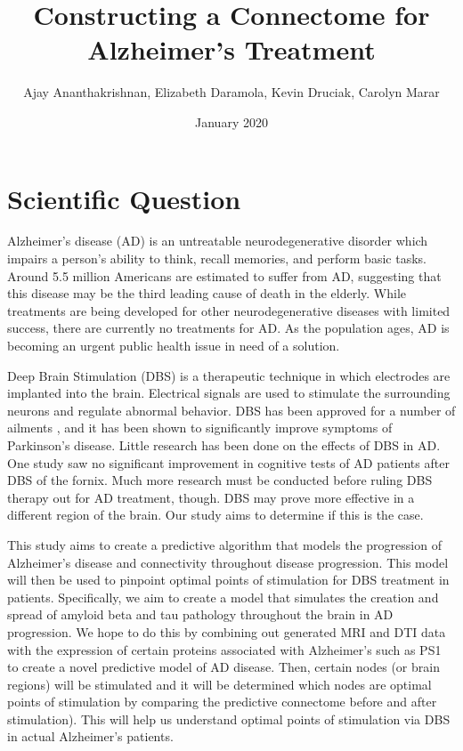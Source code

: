 \documentclass{article}
\title{Constructing a Connectome for Alzheimer's Treatment}
\author{Ajay Ananthakrishnan, Elizabeth Daramola, Kevin Druciak, Carolyn Marar }
\date{January 2020}
\begin{document}
\maketitle

\section{Scientific Question}
Alzheimer's disease (AD) is an untreatable neurodegenerative disorder which impairs a person's ability to think, recall memories, and perform basic tasks. Around 5.5 million Americans are estimated to suffer from AD, suggesting that this disease may be the third leading cause of death in the elderly. \cite{Alzheimer's Facts} While treatments are being developed for other neurodegenerative diseases with limited success, there are currently no treatments for AD. As the population ages, AD is becoming an urgent public health issue in need of a solution.

Deep Brain Stimulation (DBS) is a therapeutic technique in which electrodes are implanted into the brain. Electrical signals are used to stimulate the surrounding neurons and regulate abnormal behavior. DBS has been approved for a number of ailments \cite{DBS uses}, and it has been shown to significantly improve symptoms of Parkinson's disease. \cite{DBS PD} Little research has been done on the effects of DBS in AD. One study saw no significant improvement in cognitive tests of AD patients after DBS of the fornix. \cite{DBS AD} Much more research must be conducted before ruling DBS therapy out for AD treatment, though. DBS may prove more effective in a different region of the brain. Our study aims to determine if this is the case.

This study aims to create a predictive algorithm that models the progression of Alzheimer’s disease and connectivity throughout disease progression. This model will then be used to pinpoint optimal points of stimulation for DBS treatment in patients. Specifically, we aim to create a model that simulates the creation and spread of amyloid beta and tau pathology throughout the brain in AD progression. We hope to do this by combining out generated MRI and DTI data with the expression of certain proteins associated with Alzheimer’s such as PS1 to create a novel predictive model of AD disease. Then, certain nodes (or brain regions) will be stimulated and it will be determined which nodes are optimal points of stimulation by comparing the predictive connectome before and after stimulation). This will help us understand optimal points of stimulation via DBS in actual Alzheimer’s patients.
\end{document}
